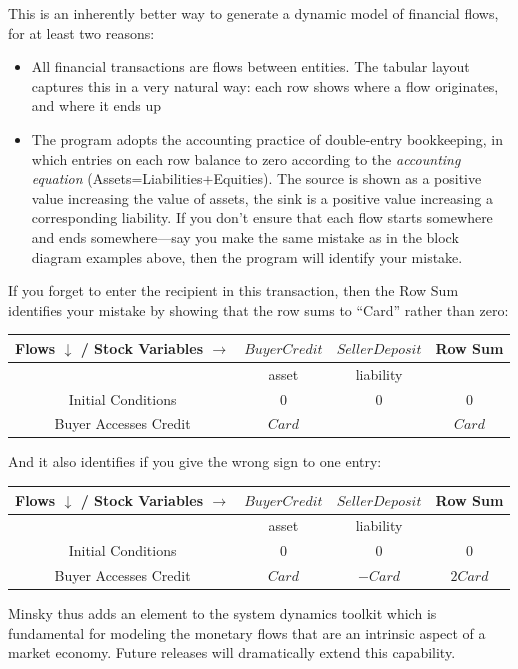 This is an inherently better way to generate a dynamic model of financial
flows, for at least two reasons: 
\begin{itemize}
\item All financial transactions are flows between entities. The tabular
layout captures this in a very natural way: each row shows where a
flow originates, and where it ends up 
\item The program adopts the accounting practice of double-entry bookkeeping,
in which entries on each row balance to zero according to the {\em
accounting equation} (Assets=Liabilities+Equities). The source is
shown as a positive value increasing the value of assets, the sink
is a positive value increasing a corresponding liability. If you don't
ensure that each flow starts somewhere and ends somewhere---say you
make the same mistake as in the block diagram examples above, then
the program will identify your mistake. 
\end{itemize}
If you forget to enter the recipient in this transaction, then the
Row Sum identifies your mistake by showing that the row sums to ``Card''
rather than zero:
\begin{center}
\begin{tabular}{|c|c||c|c|}
\hline 
Flows $\downarrow$ / Stock Variables $\rightarrow$ & \multicolumn{1}{c||}{$BuyerCredit$} & \multicolumn{1}{c|}{$SellerDeposit$} & Row Sum\tabularnewline
\hline 
 & \multicolumn{1}{c||}{asset} & \multicolumn{1}{c|}{liability} & \tabularnewline
\hline 
Initial Conditions & \multicolumn{1}{c}{$0$} & $0$ & 0\tabularnewline
Buyer Accesses Credit & \multicolumn{1}{c}{$Card$} &  & $Card$\tabularnewline
\hline 
\end{tabular}
\par\end{center}

And it also identifies if you give the wrong sign to one entry:
\begin{center}
\begin{tabular}{|c|c||c|c|}
\hline 
Flows $\downarrow$ / Stock Variables $\rightarrow$ & \multicolumn{1}{c||}{$BuyerCredit$} & \multicolumn{1}{c|}{$SellerDeposit$} & Row Sum\tabularnewline
\hline 
 & \multicolumn{1}{c||}{asset} & \multicolumn{1}{c|}{liability} & \tabularnewline
\hline 
Initial Conditions & \multicolumn{1}{c}{$0$} & $0$ & 0\tabularnewline
Buyer Accesses Credit & \multicolumn{1}{c}{$Card$} & $-Card$ & $2Card$\tabularnewline
\hline 
\end{tabular}
\par\end{center}

Minsky thus adds an element to the system dynamics toolkit which is
fundamental for modeling the monetary flows that are an intrinsic
aspect of a market economy. Future releases will dramatically extend
this capability.
